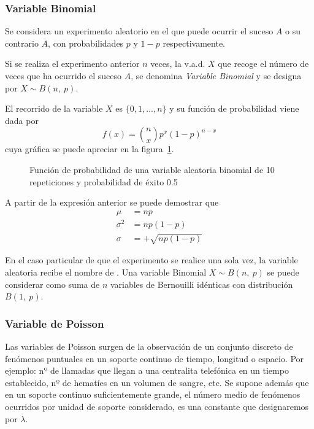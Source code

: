 \subsubsection{Variable Binomial}

Se considera un experimento aleatorio en el que puede ocurrir el suceso $A$ o su contrario $\overline{A}$, con
probabilidades $p$ y $1-p$ respectivamente.

Si se realiza el experimento anterior $n$ veces, la v.a.d. $X$ que recoge el número de veces que ha ocurrido el suceso
$A$, se denomina \emph{Variable Binomial} y se designa por $X\sim B(n,\ p)$.

El recorrido de la variable $X$ es $\{0,1,...,n\}$ y su función de probabilidad viene dada por 
\[
f(x)= \binom{n}{x} p^x \left( {1 - p} \right)^{n - x} 
\] 
cuya gráfica se puede apreciar en la figura~\ref{g:binomial}.

\begin{figure}[h!]
\centering
\scalebox{0.8}{} 
\caption{Función de probabilidad de una variable aleatoria binomial de 10 repeticiones y probabilidad de éxito 0.5}\label{g:binomial}
\end{figure}

A partir de la expresión anterior se puede demostrar que
\begin{align*}
\mu  &= n p\\
\sigma ^2  &= n p (1 - p)\\
\sigma  &=  + \sqrt {n p (1 - p)}
\end{align*}

En el caso particular de que el experimento se realice una sola vez, la variable aleatoria recibe el nombre de
.
Una variable Binomial $X\sim B(n,\ p)$ se puede considerar como suma de $n$ variables de Bernouilli idénticas con
distribución $B(1,\ p)$.


\subsubsection{Variable de Poisson}
Las variables de Poisson surgen de la observación de un conjunto discreto de fenómenos puntuales en un soporte continuo
de tiempo, longitud o espacio.
Por ejemplo: nº de llamadas que llegan a una centralita telefónica en un tiempo establecido, nº de hematíes en un
volumen de sangre, etc.
Se supone además que en un soporte continuo suficientemente grande, el número medio de fenómenos ocurridos por unidad de
soporte considerado, es una constante que designaremos por $\lambda$.

